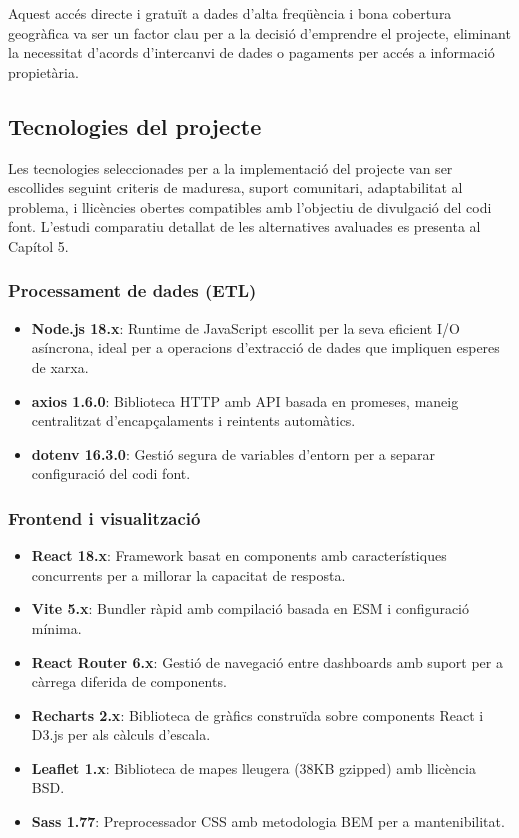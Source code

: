 Aquest accés directe i gratuït a dades d'alta freqüència i bona cobertura geogràfica va ser un factor clau per a la decisió d'emprendre el projecte, eliminant la necessitat d'acords d'intercanvi de dades o pagaments per accés a informació propietària.

\subsection{Tecnologies del projecte}
Les tecnologies seleccionades per a la implementació del projecte van ser escollides seguint criteris de maduresa, suport comunitari, adaptabilitat al problema, i llicències obertes compatibles amb l'objectiu de divulgació del codi font. L'estudi comparatiu detallat de les alternatives avaluades es presenta al Capítol 5.

\subsubsection{Processament de dades (ETL)}
\begin{itemize}
    \item \textbf{Node.js 18.x}: Runtime de JavaScript escollit per la seva eficient I/O asíncrona, ideal per a operacions d'extracció de dades que impliquen esperes de xarxa.
    \item \textbf{axios 1.6.0}: Biblioteca HTTP amb API basada en promeses, maneig centralitzat d'encapçalaments i reintents automàtics.
    \item \textbf{dotenv 16.3.0}: Gestió segura de variables d'entorn per a separar configuració del codi font.
\end{itemize}

\subsubsection{Frontend i visualització}
\begin{itemize}
    \item \textbf{React 18.x}: Framework basat en components amb característiques concurrents per a millorar la capacitat de resposta.
    \item \textbf{Vite 5.x}: Bundler ràpid amb compilació basada en ESM i configuració mínima.
    \item \textbf{React Router 6.x}: Gestió de navegació entre dashboards amb suport per a càrrega diferida de components.
    \item \textbf{Recharts 2.x}: Biblioteca de gràfics construïda sobre components React i D3.js per als càlculs d'escala.
    \item \textbf{Leaflet 1.x}: Biblioteca de mapes lleugera (38KB gzipped) amb llicència BSD.
    \item \textbf{Sass 1.77}: Preprocessador CSS amb metodologia BEM per a mantenibilitat.
\end{itemize}

